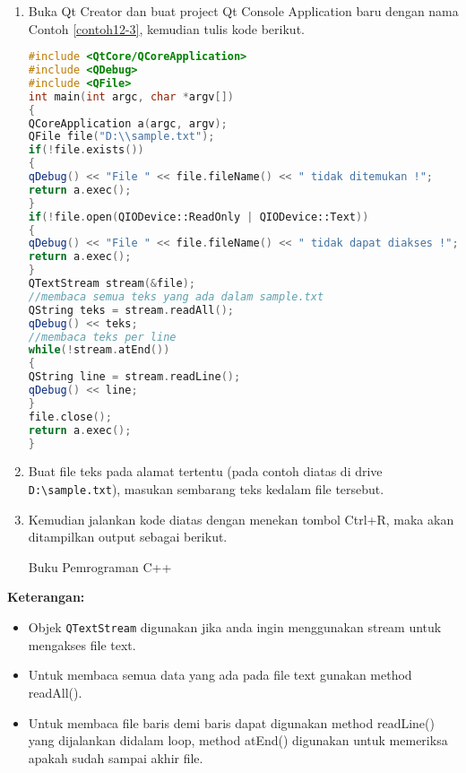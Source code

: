 \begin{enumerate}

\item
  Buka Qt Creator dan buat project Qt Console Application baru dengan
  nama Contoh \ref{contoh12-3}, kemudian tulis kode berikut.

\begin{lstlisting}[language=c++, caption=Menggunakan Stream untuk membaca file, label=contoh12-3]
#include <QtCore/QCoreApplication>
#include <QDebug>
#include <QFile>
int main(int argc, char *argv[])
{
QCoreApplication a(argc, argv);
QFile file("D:\\sample.txt");
if(!file.exists())
{
qDebug() << "File " << file.fileName() << " tidak ditemukan !";
return a.exec();
}
if(!file.open(QIODevice::ReadOnly | QIODevice::Text))
{
qDebug() << "File " << file.fileName() << " tidak dapat diakses !";
return a.exec();
}
QTextStream stream(&file);
//membaca semua teks yang ada dalam sample.txt
QString teks = stream.readAll();
qDebug() << teks;
//membaca teks per line
while(!stream.atEnd())
{
QString line = stream.readLine();
qDebug() << line;
}
file.close();
return a.exec();
}
\end{lstlisting}
\item
  Buat file teks pada alamat tertentu (pada contoh diatas di drive
  \texttt{D:\textbackslash{}sample.txt}), masukan sembarang teks kedalam
  file tersebut.
\item
  Kemudian jalankan kode diatas dengan menekan tombol Ctrl+R, maka akan
  ditampilkan output sebagai berikut.
  
  \begin{lcverbatim}
  	Buku Pemrograman C++
  \end{lcverbatim}
\end{enumerate}

\textbf{Keterangan:}

\begin{itemize}

\item
  Objek \texttt{QTextStream} digunakan jika anda ingin menggunakan
  stream untuk mengakses file text.
\item
  Untuk membaca semua data yang ada pada file text gunakan method
  readAll().
\item
  Untuk membaca file baris demi baris dapat digunakan method readLine()
  yang dijalankan didalam loop, method atEnd() digunakan untuk memeriksa
  apakah sudah sampai akhir file.
\end{itemize}

